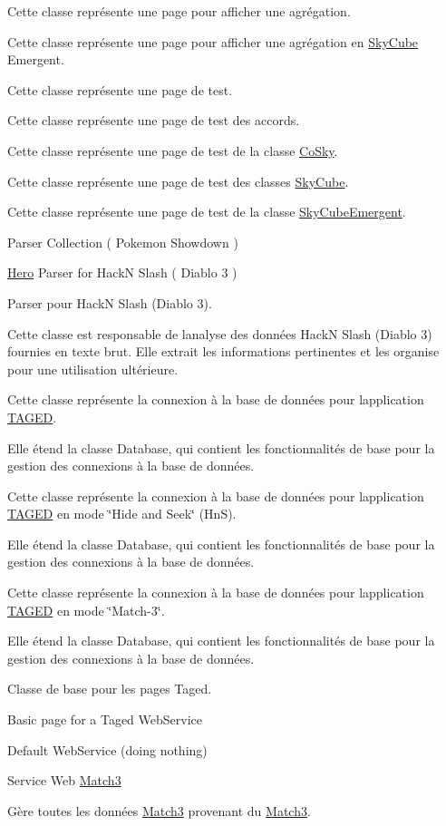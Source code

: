 Cette classe représente une page pour afficher une agrégation.

Cette classe représente une page pour afficher une agrégation en \hyperlink{class_sky_cube}{Sky\+Cube} Emergent.

Cette classe représente une page de test.

Cette classe représente une page de test des accords.

Cette classe représente une page de test de la classe \hyperlink{class_co_sky}{Co\+Sky}.

Cette classe représente une page de test des classes \hyperlink{class_sky_cube}{Sky\+Cube}.

Cette classe représente une page de test de la classe \hyperlink{class_sky_cube_emergent}{Sky\+Cube\+Emergent}.

Parser Collection ( Pokemon Showdown ) 

\hyperlink{class_hero}{Hero} Parser for Hack\textquotesingle{}N Slash ( Diablo 3 ) 

Parser pour Hack\textquotesingle{}N Slash (Diablo 3).

Cette classe est responsable de l\textquotesingle{}analyse des données Hack\textquotesingle{}N Slash (Diablo 3) fournies en texte brut. Elle extrait les informations pertinentes et les organise pour une utilisation ultérieure.

Cette classe représente la connexion à la base de données pour l\textquotesingle{}application \hyperlink{namespace_t_a_g_e_d}{T\+A\+G\+ED}.

Elle étend la classe Database, qui contient les fonctionnalités de base pour la gestion des connexions à la base de données.

Cette classe représente la connexion à la base de données pour l\textquotesingle{}application \hyperlink{namespace_t_a_g_e_d}{T\+A\+G\+ED} en mode \char`\"{}\+Hide and Seek\char`\"{} (HnS).

Elle étend la classe Database, qui contient les fonctionnalités de base pour la gestion des connexions à la base de données.

Cette classe représente la connexion à la base de données pour l\textquotesingle{}application \hyperlink{namespace_t_a_g_e_d}{T\+A\+G\+ED} en mode \char`\"{}\+Match-\/3\char`\"{}.

Elle étend la classe Database, qui contient les fonctionnalités de base pour la gestion des connexions à la base de données.

Classe de base pour les pages Taged.

Basic page for a Taged Web\+Service

Default Web\+Service (doing nothing) 

Service Web \hyperlink{class_match3}{Match3}

Gère toutes les données \hyperlink{class_match3}{Match3} provenant du \hyperlink{class_match3}{Match3}. 